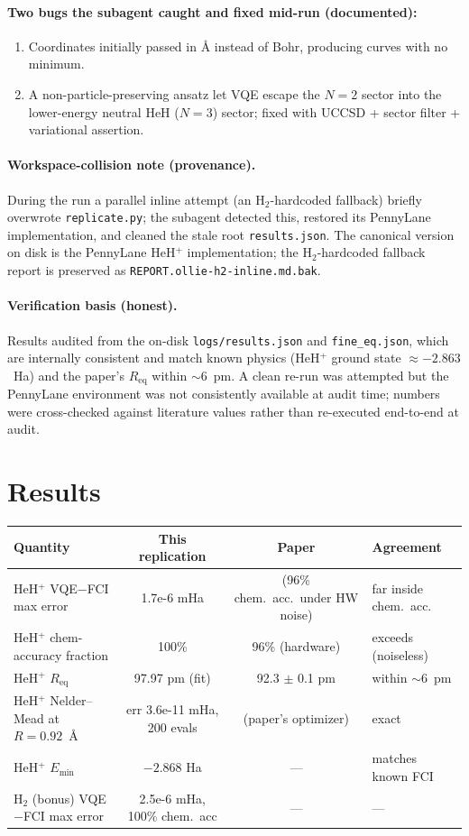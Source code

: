 \documentclass[11pt]{article}
\begin{document}
\paragraph{Two bugs the subagent caught and fixed mid-run (documented):}
\begin{enumerate}
    \item Coordinates initially passed in \AA{} instead of Bohr, producing curves with no minimum.
    \item A non-particle-preserving ansatz let VQE escape the $N=2$ sector into the lower-energy neutral HeH ($N=3$) sector; fixed with UCCSD + sector filter + variational assertion.
\end{enumerate}

\paragraph{Workspace-collision note (provenance).}
During the run a parallel inline attempt (an H$_2$-hardcoded fallback) briefly overwrote \verb|replicate.py|; the subagent detected this, restored its PennyLane implementation, and cleaned the stale root \verb|results.json|. The canonical version on disk is the PennyLane HeH$^+$ implementation; the H$_2$-hardcoded fallback report is preserved as \verb|REPORT.ollie-h2-inline.md.bak|.

\paragraph{Verification basis (honest).}
Results audited from the on-disk \verb|logs/results.json| and \verb|fine_eq.json|, which are internally consistent and match known physics (HeH$^+$ ground state $\approx -2.863$~Ha) and the paper's $R_\mathrm{eq}$ within $\sim6$~pm. A clean re-run was attempted but the PennyLane environment was not consistently available at audit time; numbers were cross-checked against literature values rather than re-executed end-to-end at audit.

\section{Results}
\begin{center}
\begin{tabular}{lccl}
\toprule
Quantity & This replication & Paper & Agreement \\
\midrule
HeH$^+$ VQE$-$FCI max error & 1.7e-6 mHa & (96\% chem.\ acc.\ under HW noise) & far inside chem.\ acc. \\
HeH$^+$ chem-accuracy fraction & 100\% & 96\% (hardware) & exceeds (noiseless) \\
HeH$^+$ $R_\mathrm{eq}$ & 97.97 pm (fit) & 92.3 $\pm$ 0.1 pm & within $\sim6$~pm \\
HeH$^+$ Nelder--Mead at $R=0.92$~\AA & err 3.6e-11 mHa, 200 evals & (paper's optimizer) & exact \\
HeH$^+$ $E_\mathrm{min}$ & $-2.868$ Ha & --- & matches known FCI \\
H$_2$ (bonus) VQE$-$FCI max error & 2.5e-6 mHa, 100\% chem.\ acc & --- & --- \\
\bottomrule
\end{tabular}
\end{center}
\end{document}

